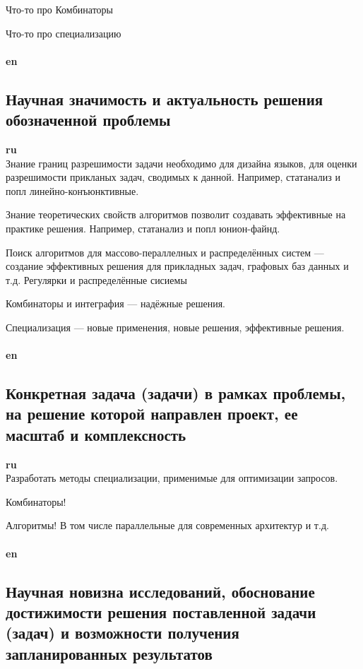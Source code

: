 \documentclass[12pt]{article}  %
\theoremstyle{remark}
\begin{document}
Что-то про Комбинаторы

Что-то про специализацию
\\
\\
\textbf{en}\\

\subsection{Научная значимость и актуальность решения обозначенной проблемы}

\textbf{ru}\\
%
Знание границ разрешимости задачи необходимо для дизайна языков, для оценки разрешимости прикланых задач, сводимых к данной.
Например, статанализ и попл линейно-конъюнктивные.

Знание теоретических свойств алгоритмов позволит создавать эффективные на практике решения.
Например, статанализ и попл юнион-файнд.

Поиск алгоритмов для массово-пераллелных и распределённых систем --- создание эффективных решения для прикладных задач, графовых баз данных и т.д. Регулярки и распределённые сисиемы

Комбинаторы и интеграфия --- надёжные решения.


Специализация --- новые применения, новые решения, эффективные решения. 
\\
\\
\textbf{en}\\


\subsection{Конкретная задача (задачи) в рамках проблемы, на решение которой направлен проект, ее масштаб и комплексность}

\textbf{ru}\\
%
Разработать методы специализации, применимые для оптимизации запросов.

Комбинаторы!

Алгоритмы! В том числе параллельные для современных архитектур и т.д.
\\
\\
\textbf{en}\\

\subsection{Научная новизна исследований, обоснование достижимости решения поставленной задачи (задач) и возможности получения запланированных результатов}
\end{document}
